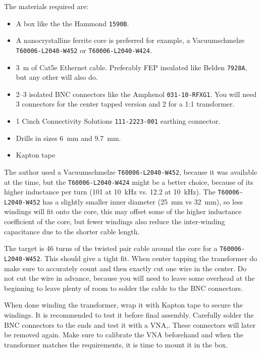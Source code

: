 \documentclass[12pt]{book}
\providecommand{\device}[1]{\texttt{\small #1}}
\begin{document}
The materials required are:

\begin{itemize}
    \itemsep0em
    \item A box like the the Hammond \device{1590B}.
    \item A nanocrystalline ferrite core is preferred for example, a Vacuumschmelze \device{T60006-L2040-W452} or \device{T60006-L2040-W424}.
    \item \qty{3}{\m} of Cat5e Ethernet cable. Preferably FEP insulated like Belden \device{7928A}, but any other will also do.
    \item \numrange{2}{3} isolated BNC connectors like the Amphenol \device{031-10-RFXG1}. You will need \num{3} connectors for the center tapped version and \num{2} for a 1:1 transformer.
    \item \num{1} Cinch Connectivity Solutions \device{111-2223-001} earthing connector.
    \item Drills in sizes \qty{6}{\mm} and \qty{9.7}{\mm}.
    \item Kapton tape
\end{itemize}

The author used a Vacuumschmelze \device{T60006-L2040-W452}, because it was available at the time, but the \device{T60006-L2040-W424} might be a better choice, because of its higher inductance per turn (\qty{101}{\uH} at \qty{10}{\kHz} vs. \qty{12.2}{\uH} at \qty{10}{\kHz}). The \device{T60006-L2040-W452} has a slightly smaller inner diameter (\qty{25}{\mm} vs \qty{32}{\mm}), so less windings will fit onto the core, this may offset some of the higher inductance coefficient of the core, but fewer windings also reduce the inter-winding capacitance due to the shorter cable length.

The target is \num{46} turns of the twisted pair cable around the core for a \device{T60006-L2040-W452}. This should give a tight fit. When center tapping the transformer do make sure to accurately count and then exactly cut one wire in the center. Do not cut the wire in advance, because you will need to leave some overhead at the beginning to leave plenty of room to solder the cable to the BNC connectors.

When done winding the transformer, wrap it with Kapton tape to secure the windings. It is recommended to test it before final assembly. Carefully solder the BNC connectors to the ends and test it with a VNA,. These connectors will later be removed again. Make sure to calibrate the VNA beforehand and when the transformer matches the requirements, it is time to mount it in the box.
\end{document}
